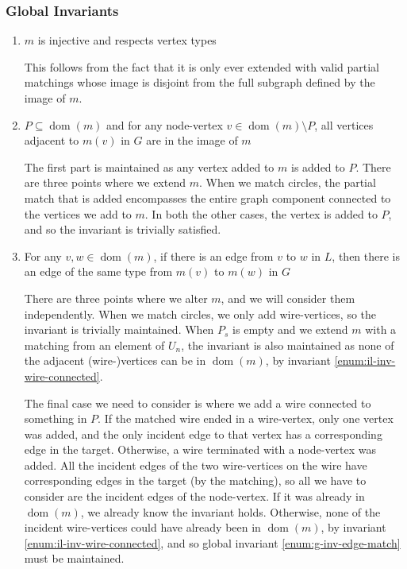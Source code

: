 \documentclass{article}
\DeclareMathOperator{\dom}{dom}
\begin{document}
\subsubsection{Global Invariants}
\label{sec:il-global-inv}


\begin{enumerate}
  \renewcommand{\theenumi}{(\arabic{enumi})}
  \renewcommand{\labelenumi}{\theenumi}
  \item $m$ is injective and respects vertex types

  This follows from the fact that it is only ever extended with valid partial matchings whose image is disjoint from the full subgraph defined by the image of $m$.
  \item $P \subseteq \dom(m)$ and for any node-vertex $v \in \dom(m)\setminus P$, all vertices adjacent to $m(v)$ in $G$ are in the image of $m$

  The first part is maintained as any vertex added to $m$ is added to $P$.  There are three points where we extend $m$.  When we match circles, the partial match that is added encompasses the entire graph component connected to the vertices we add to $m$.  In both the other cases, the vertex is added to $P$, and so the invariant is trivially satisfied.

  \item For any $v,w \in \dom(m)$, if there is an edge from $v$ to $w$ in $L$, then there is an edge of the same type from $m(v)$ to $m(w)$ in $G$

  There are three points where we alter $m$, and we will consider them independently.  When we match circles, we only add wire-vertices, so the invariant is trivially maintained.  When $P_s$ is empty and we extend $m$ with a matching from an element of $U_n$, the invariant is also maintained as none of the adjacent (wire-)vertices can be in $\dom(m)$, by invariant \ref{enum:il-inv-wire-connected}.

The final case we need to consider is where we add a wire connected to something in $P$.  If the matched wire ended in a wire-vertex, only one vertex was added, and the only incident edge to that vertex has a corresponding edge in the target.  Otherwise, a wire terminated with a node-vertex was added.  All the incident edges of the two wire-vertices on the wire have corresponding edges in the target (by the matching), so all we have to consider are the incident edges of the node-vertex.  If it was already in $\dom(m)$, we already know the invariant holds.  Otherwise, none of the incident wire-vertices could have already been in $\dom(m)$, by invariant \ref{enum:il-inv-wire-connected}, and so global invariant \ref{enum:g-inv-edge-match} must be maintained.
\end{enumerate}
\end{document}
